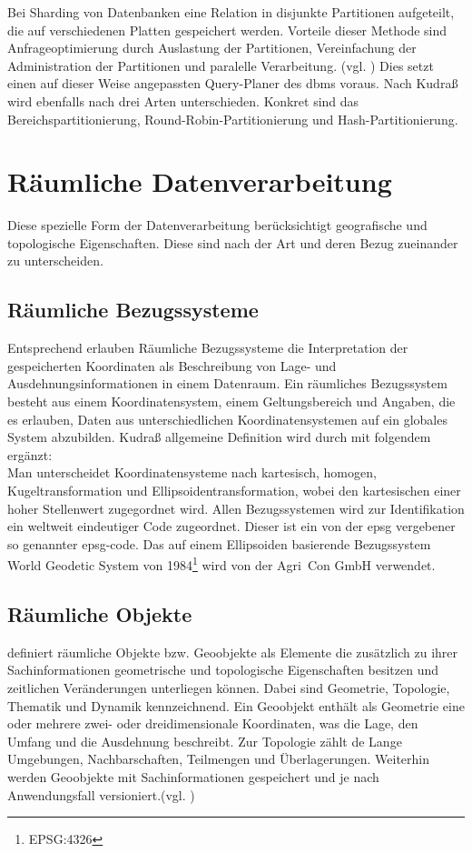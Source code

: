Bei Sharding von Datenbanken eine Relation in disjunkte Partitionen aufgeteilt, die auf verschiedenen Platten gespeichert werden.
Vorteile dieser Methode sind Anfrageoptimierung durch Auslastung der Partitionen, Vereinfachung der Administration der Partitionen und paralelle Verarbeitung. (vgl. \cite[S.296]{book:kudrass})
Dies setzt einen auf dieser Weise angepassten Query-Planer des \Gls{dbms} voraus.
Nach Kudraß wird ebenfalls nach drei Arten unterschieden.
Konkret sind das Bereichspartitionierung, Round-Robin-Partitionierung und Hash-Partitionierung.

\section{Räumliche Datenverarbeitung}

Diese spezielle Form der Datenverarbeitung berücksichtigt geografische und topologische Eigenschaften.
Diese sind nach der Art und deren Bezug zueinander zu unterscheiden.

\subsection{Räumliche Bezugssysteme}
Entsprechend \cite[S.506]{book:kudrass} erlauben Räumliche Bezugssysteme die Interpretation der gespeicherten Koordinaten als Beschreibung von Lage- und Ausdehnungsinformationen in einem Datenraum. Ein räumliches Bezugssystem besteht aus einem Koordinatensystem, einem Geltungsbereich und Angaben, die es erlauben, Daten aus unterschiedlichen Koordinatensystemen auf ein globales System abzubilden.
Kudraß allgemeine Definition wird durch \cite[S.141 ff.]{book:gi-theopluspraxis3} mit folgendem ergänzt:\\
Man unterscheidet Koordinatensysteme nach kartesisch, homogen, Kugeltransformation und Ellipsoidentransformation, wobei den kartesischen einer hoher Stellenwert zugegordnet wird.
Allen Bezugssystemen wird zur Identifikation ein weltweit eindeutiger Code zugeordnet.
Dieser ist ein von der \Gls{epsg} vergebener so genannter \Gls{epsg-code}.
Das auf einem Ellipsoiden basierende Bezugssystem World Geodetic System von 1984\footnote{EPSG:4326} wird von der Agri~Con GmbH verwendet.


\subsection{Räumliche Objekte}
\cite[S.133]{book:gi-theopluspraxis3} definiert räumliche Objekte bzw. Geoobjekte als Elemente die zusätzlich zu ihrer Sachinformationen geometrische und topologische Eigenschaften besitzen und zeitlichen Veränderungen unterliegen können. Dabei sind Geometrie, Topologie, Thematik und Dynamik kennzeichnend.
Ein Geoobjekt enthält als Geometrie eine oder mehrere zwei- oder dreidimensionale Koordinaten, was die Lage, den Umfang und die Ausdehnung beschreibt.
Zur Topologie zählt de Lange Umgebungen, Nachbarschaften, Teilmengen und Überlagerungen.
Weiterhin werden Geoobjekte mit Sachinformationen gespeichert und je nach Anwendungsfall versioniert.(vgl. \cite[S.133]{book:gi-theopluspraxis3})


